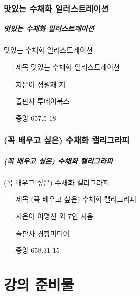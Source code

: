 \documentclass[aspectratio=1610,17pt,xcolor=pdftex,dvipsnames,table,handout]{beamer}
\begin{document}
		\section{	맛있는 수채화 일러스트레이션	}
		\begin{frame} [t,plain]
		\frametitle{	맛있는 수채화 일러스트레이션	}
			\begin{block} {	맛있는 수채화 일러스트레이션	}
			\setlength{\leftmargini}{4em}			
			\begin{itemize}
				\item [제목] 	맛있는 수채화 일러스트레이션	
				\item [지은이] 정원재 저	
				\item [출판사] 투데이북스	
				\item [중앙] 657.5-18		
			\end{itemize}
			\end{block}						
								
		\end{frame}						


		\section{	(꼭 배우고 싶은) 수채화 캘리그라피	 }
		\begin{frame} [t,plain]
		\frametitle{	(꼭 배우고 싶은) 수채화 캘리그라피	 }
			\begin{block} {	(꼭 배우고 싶은) 수채화 캘리그라피	 }
			\setlength{\leftmargini}{4em}			
			\begin{itemize}
				\item [제목] 	(꼭 배우고 싶은) 수채화 캘리그라피	 
				\item [지은이] 이명선 외 7인 지음	
				\item [출판사] 경향미디어	
				\item [중앙] 658.31-15		
			\end{itemize}
			\end{block}						
								
		\end{frame}						




		\part{강의 준비물}
		\frame{\partpage}
		
\end{document}

